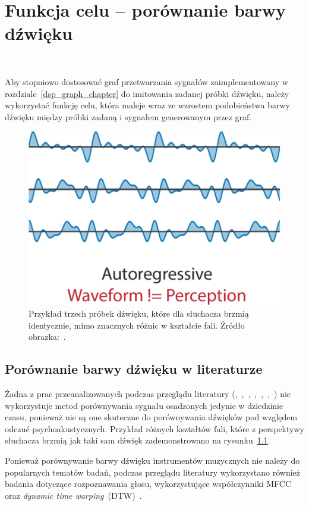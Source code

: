 \chapter{Funkcja celu -- porównanie barwy dźwięku}~\label{target_function_chapter}

Aby stopniowo dostosować graf przetwarzania sygnałów zaimplementowany 
w rozdziale~\ref{dsp_graph_chapter} do imitowania zadanej próbki dźwięku,
należy wykorzystać funkcję celu, która maleje wraz ze wzrostem podobieństwa
barwy dźwięku między próbki zadaną i sygnałem generowanym przez graf. 

\begin{figure}[H]\label{fig:waveform_not_equal_to_perception}
    \centering
    \includegraphics[width=0.5\linewidth]{rys03/d_dsp_example_graph.png}
    \caption{
      Przykład trzech próbek dźwięku, które dla słuchacza brzmią identycznie, mimo
      znacznych różnic w kształcie fali. Źródło obrazka:~\cite{engel2020ddsp}.
    }
\end{figure}

\section{Porównanie barwy dźwięku w literaturze}\label{sec:timbre_comparison_literature_overview}

Żadna z prac przeanalizowanych podczas przeglądu literatury
(\cite{engel2020ddsp},~\cite{ieee_synth_programming},~\cite{ddx7},~\cite{riffusion},~\cite{evolutionary_puredata},~\cite{parallel_evolutionary_optimization_synth_parameters},~\cite{mfcc_dtw})
nie wykorzystuje metod porównywania sygnału osadzonych jedynie w dziedzinie czasu, ponieważ
nie są one skuteczne do porównywania dźwięków pod względem odczuć psychoakustycznych.
Przykład różnych kształtów fali, które z perspektywy słuchacza brzmią jak
taki sam dźwięk zademonstrowano na rysunku~\ref{fig:waveform_not_equal_to_perception}.

Ponieważ porównywanie barwy dźwięku instrumentów muzycznych nie należy do popularnych
tematów badań, podczas przeglądu literatury wykorzystano również badania dotyczące
rozpoznawania głosu, wykorzystujące współczynniki MFCC oraz
\textit{dynamic time warping}~(DTW)~\cite{mfcc_dtw}.

